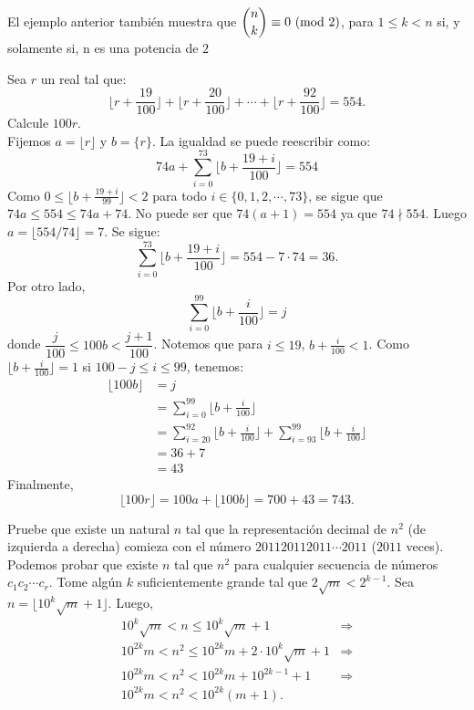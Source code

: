 	\begin{obs}
			El ejemplo anterior tambi\'en muestra que $\dbinom{n}{k} \equiv 0 \ (\mathrm{mod}\ 2)$, para $1 \leq k < n$ si, y solamente si, n es una potencia de $2$
	\end{obs}
	\begin{ej}
		Sea $r$ un real tal que: 
		$$\biggl\lfloor r + \frac{19}{100} \biggr\rfloor + \biggl\lfloor r + \frac{20}{100} \biggr\rfloor + \cdots + \biggl\lfloor r + \frac{92}{100} \biggr\rfloor = 554.$$
		Calcule $100r.$\\
		
		Fijemos $a= \lfloor r \rfloor$ y $b = \{r\}$. La igualdad se puede reescribir como:
		$$74a + \sum_{i = 0}^{73} \biggl\lfloor b + \frac{19 + i}{100} \biggr\rfloor = 554$$
		Como $0 \leq \biggl\lfloor b + \frac{19 + i}{99} \biggr\rfloor < 2$ para todo $i \in \{0,1,2,\cdots,73\}$, se sigue que $74a \leq 554 \leq 74a +74.$ No puede ser que $74(a + 1) = 554$ ya que $74 \nmid 554$. Luego $a = \biggl\lfloor 554/74 \biggr\rfloor = 7.$ Se sigue:
		$$\sum_{i = 0}^{73} \biggl\lfloor b + \frac{19 + i}{100} \biggr\rfloor = 554 - 7 \cdot 74 = 36.$$
		Por otro lado, 
		$$ \sum_{i = 0}^{99} \biggl\lfloor b + \frac{i}{100} \biggr\rfloor = j$$
		donde $\dfrac{j}{100} \leq 100b < \dfrac{j+1}{100}$. Notemos que para $i \leq 19$, $b + \frac{i}{100} < 1$. Como $\biggl\lfloor b + \frac{i}{100} \biggr\rfloor = 1$ si $100 -j \leq i \leq 99$, tenemos:
		\begin{align*}
			\lfloor 100b \rfloor &= j \\
			&=  \sum_{i = 0}^{99} \biggl\lfloor b + \frac{i}{100} \biggr\rfloor \\
			&= \sum_{i = 20}^{92} \biggl\lfloor b + \frac{i}{100} \biggr\rfloor + \sum_{i = 93}^{99} \biggl\lfloor b + \frac{i}{100} \biggr\rfloor \\
			&= 36 + 7 \\
			&= 43
		\end{align*}
		Finalmente, 
		$$ \lfloor 100r \rfloor = 100a + \lfloor 100b \rfloor = 700 + 43 = 743.$$
	\end{ej}
	\begin{ej}
		Pruebe que existe un natural $n$ tal que la representaci\'on decimal de $n^{2}$ (de izquierda a derecha) comieza  con el n\'umero $201120112011\cdots2011$ ($2011$ veces).\\
		
		Podemos probar que existe $n$ tal que $n^{2}$ para cualquier secuencia de n\'umeros $c_{1}c_{2} \cdots c_{r}$. Tome alg\'un $k$ suficientemente grande tal que $2\sqrt{m}<2^{k-1}$.
		Sea\\ 
		$n = \lfloor10^{k}\sqrt{m} + 1 \rfloor$. Luego,
		\begin{align*}
			10^{k}\sqrt{m}< n \leq 10^{k}\sqrt{m} + 1 &\Rightarrow \\
			10^{2k}m< n^{2} \leq 10^{2k}m + 2 \cdot 10^{k}\sqrt{m} + 1 &\Rightarrow\\
			10^{2k}m< n^{2} < 10^{2k}m + 10^{2k - 1} + 1 &\Rightarrow\\
			10^{2k}m< n^{2} < 10^{2k}(m + 1).
		\end{align*}
	\end{ej}
